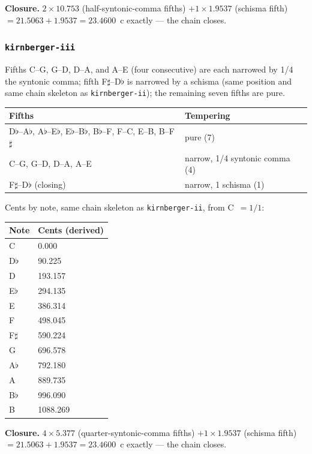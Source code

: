 \documentclass[11pt,letterpaper]{report}
\begin{document}
\textbf{Closure.} $2 \times 10.753$ (half-syntonic-comma fifths) $+ 1
\times 1.9537$ (schisma fifth) $= 21.5063 + 1.9537 = 23.4600$~c exactly
--- the chain closes.

\subsubsection{\texttt{kirnberger-iii}}

Fifths C--G, G--D, D--A, and A--E (four consecutive) are each narrowed
by 1/4 the syntonic comma; fifth F$\sharp$--D$\flat$ is narrowed by a
schisma (same position and same chain skeleton as
\texttt{kirnberger-ii}); the remaining seven fifths are pure.

\begin{longtable}{p{9.5cm} p{2.5cm}}
  \toprule
  \textbf{Fifths} & \textbf{Tempering} \\
  \midrule
  \endhead
  D$\flat$--A$\flat$, A$\flat$--E$\flat$, E$\flat$--B$\flat$,
    B$\flat$--F, F--C, E--B, B--F$\sharp$ & pure (7) \\
  C--G, G--D, D--A, A--E & narrow, 1/4 syntonic comma (4) \\
  F$\sharp$--D$\flat$ (closing) & narrow, 1 schisma (1) \\
  \bottomrule
\end{longtable}

Cents by note, same chain skeleton as \texttt{kirnberger-ii}, from
C~$= 1/1$:

\begin{longtable}{p{2.2cm} p{3.5cm}}
  \toprule
  \textbf{Note} & \textbf{Cents (derived)} \\
  \midrule
  \endhead
  C & 0.000 \\
  D$\flat$ & 90.225 \\
  D & 193.157 \\
  E$\flat$ & 294.135 \\
  E & 386.314 \\
  F & 498.045 \\
  F$\sharp$ & 590.224 \\
  G & 696.578 \\
  A$\flat$ & 792.180 \\
  A & 889.735 \\
  B$\flat$ & 996.090 \\
  B & 1088.269 \\
  \bottomrule
\end{longtable}

\textbf{Closure.} $4 \times 5.377$ (quarter-syntonic-comma fifths) $+ 1
\times 1.9537$ (schisma fifth) $= 21.5063 + 1.9537 = 23.4600$~c exactly
--- the chain closes.
\end{document}
